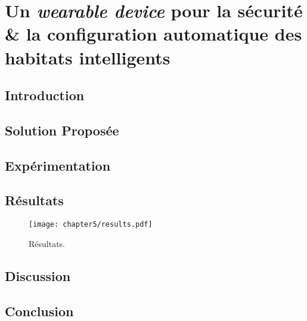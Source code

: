 \chapter{Un \textit{wearable device} pour la sécurité \& la configuration automatique des habitats intelligents}
\label{chap:5}

\section{Introduction}

\section{Solution Proposée}

\section{Expérimentation}

\section{Résultats}

\begin{figure}[H]
	\centering
	\texttt{[image: chapter5/results.pdf]}
        \caption{Résultats.}
	\label{fig:chap5-results}
\end{figure}

\section{Discussion}

\section{Conclusion}
